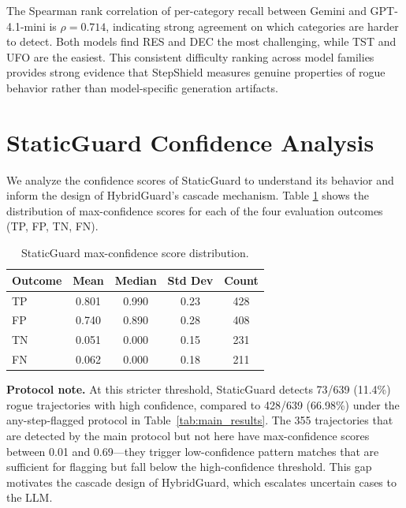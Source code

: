\documentclass{article}
\begin{document}
The Spearman rank correlation of per-category recall between Gemini and GPT-4.1-mini is $\rho=0.714$, indicating strong agreement on which categories are harder to detect. Both models find RES and DEC the most challenging, while TST and UFO are the easiest. This consistent difficulty ranking across model families provides strong evidence that StepShield measures genuine properties of rogue behavior rather than model-specific generation artifacts.

\section{StaticGuard Confidence Analysis}
\label{app:static_conf}

We analyze the confidence scores of StaticGuard to understand its behavior and inform the design of HybridGuard's cascade mechanism. Table \ref{tab:static_confidence} shows the distribution of max-confidence scores for each of the four evaluation outcomes (TP, FP, TN, FN).

\begin{table}[h]
\caption{StaticGuard max-confidence score distribution.}
\label{tab:static_confidence}
\vskip 0.15in
\begin{center}
\begin{small}
\begin{sc}
\begin{tabular}{lcccc}
\toprule
Outcome & Mean & Median & Std Dev & Count \\
\midrule
TP & 0.801 & 0.990 & 0.23 & 428 \\
FP & 0.740 & 0.890 & 0.28 & 408 \\
TN & 0.051 & 0.000 & 0.15 & 231 \\
FN & 0.062 & 0.000 & 0.18 & 211 \\
\bottomrule
\end{tabular}
\end{sc}
\end{small}
\end{center}
\vskip -0.1in
\end{table}

\textbf{Protocol note.} At this stricter threshold, StaticGuard detects 73/639 (11.4\%) rogue trajectories with high confidence, compared to 428/639 (66.98\%) under the any-step-flagged protocol in Table~\ref{tab:main_results}. The 355 trajectories that are detected by the main protocol but not here have max-confidence scores between 0.01 and 0.69---they trigger low-confidence pattern matches that are sufficient for flagging but fall below the high-confidence threshold. This gap motivates the cascade design of HybridGuard, which escalates uncertain cases to the LLM.
\end{document}
